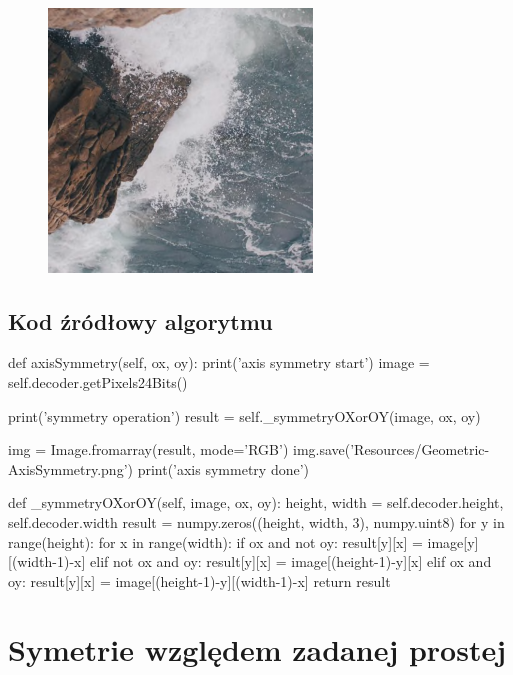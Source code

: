\documentclass[a4paper,12pt]{book}
\begin{document}
\begin{figure}[H]
	\includegraphics[width=7cm, height=7cm]{sea-symmetry-xy.png}
\end{figure}
\subsection*{Kod źródłowy algorytmu}
\begin{python}
def axisSymmetry(self, ox, oy):
	print('axis symmetry start')
	image = self.decoder.getPixels24Bits()
	
	print('symmetry operation')
	result = self._symmetryOXorOY(image, ox, oy)
	
	img = Image.fromarray(result, mode='RGB')
	img.save('Resources/Geometric-AxisSymmetry.png')
	print('axis symmetry done')

def _symmetryOXorOY(self, image, ox, oy):
	height, width = self.decoder.height, self.decoder.width
	result = numpy.zeros((height, width, 3), numpy.uint8)
	for y in range(height):
		for x in range(width): 
			if ox and not oy:
				result[y][x] = image[y][(width-1)-x]
			elif not ox and oy:
				result[y][x] = image[(height-1)-y][x]
			elif ox and oy:
				result[y][x] = image[(height-1)-y][(width-1)-x]
	return result
\end{python}
\section{Symetrie względem zadanej prostej}
\end{document}
